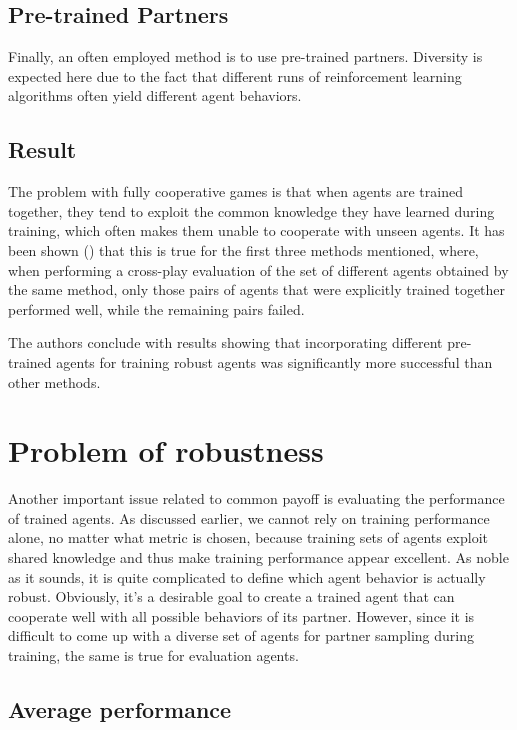 \subsection{Pre-trained Partners}
Finally, an often employed method is to use pre-trained partners.
Diversity is expected here due to the fact that different runs of reinforcement learning algorithms often yield different agent behaviors.


\subsection{Result}\label{offDiagonalReport}
The problem with fully cooperative games is that when agents are trained together, they tend to exploit the common knowledge they have learned during training, which often makes them unable to cooperate with unseen agents.
It has been shown (\cite{10.1007/978-3-030-63823-8_46}) that this is true for the first three methods mentioned, 
where, when performing a cross-play evaluation of the set of different agents obtained by the same method, 
only those pairs of agents that were explicitly trained together performed well, while the remaining pairs failed.

The authors conclude with results showing that incorporating different pre-trained agents for training robust agents was significantly more successful than other methods.


\section{Problem of robustness}\label{RobustnessEvaluation}
Another important issue related to common payoff is evaluating the performance of trained agents.
As discussed earlier, we cannot rely on training performance alone, no matter what metric is chosen, because training sets of agents exploit shared knowledge and thus make training performance appear excellent.
As noble as it sounds, it is quite complicated to define which agent behavior is actually robust.
Obviously, it's a desirable goal to create a trained agent that can cooperate well with all possible behaviors of its partner.
However, since it is difficult to come up with a diverse set of agents for partner sampling during training, the same is true for evaluation agents.

\subsection{Average performance}


